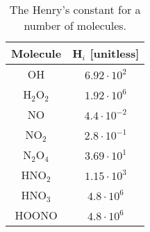 \documentclass[12pt]{article}
\begin{document}
    \begin{table}[htpb] %
        \begin{center}
            \begin{tabular}{c |c }\rmfamily
                Molecule & H$_i$ [unitless] \\ \hline \hline
                OH & $6.92\cdot10^2$\\
                H$_2$O$_2$ & $1.92\cdot10^6$\\
                NO & $4.4\cdot10^{-2}$\\
                NO$_2$ & $2.8\cdot10^{-1}$\\
                N$_2$O$_4$ & $3.69\cdot10^1$\\
                HNO$_2$ & $1.15\cdot10^3$\\
                HNO$_3$ & $4.8\cdot10^6$\\
                HOONO & $4.8\cdot10^6$\\
            \end{tabular}
    \end{center}
        \caption{The Henry's constant for a number of molecules\cite{Tian2014}.}
        \label{tab:henryconstants}
    \end{table}

\end{document}

